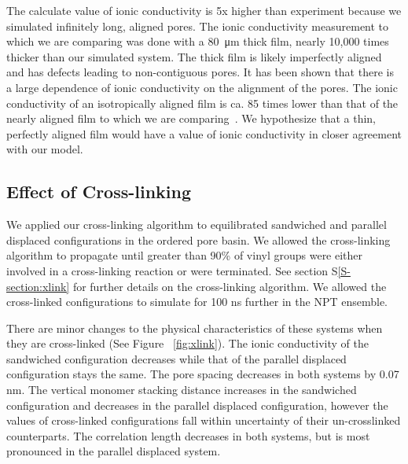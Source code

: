 \documentclass[journal=jpcbfk,manuscript=article]{achemso}
\begin{document}
  The calculate value of ionic conductivity is 5x higher than experiment because 
  we simulated infinitely long, aligned pores. The ionic conductivity measurement 
  to which we are comparing was done with a \SI{80}{\micro\metre} thick film, 
  nearly 10,000 times thicker than our simulated
  system. The thick film is likely imperfectly aligned and has defects leading to
  non-contiguous pores. It has been shown that there is a large dependence of 
  ionic conductivity on the alignment of the pores. The ionic conductivity of an
  isotropically aligned film is ca. 85 times lower than that of the nearly aligned
  film to which we are comparing~\cite{feng_scalable_2014}. We hypothesize that a 
  thin, perfectly aligned film would have a value of ionic conductivity in closer
  agreement with our model.

  \subsection{Effect of Cross-linking}\label{section:xlink}

  We applied our cross-linking algorithm to equilibrated sandwiched and parallel
  displaced configurations in the ordered pore basin. We allowed the cross-linking
  algorithm to propagate until greater than 90\% of vinyl groups were either involved
  in a cross-linking reaction or were terminated. See section S\ref{S-section:xlink}
  for further details on the cross-linking algorithm. We allowed the cross-linked
  configurations to simulate for 100 ns further in the NPT ensemble. 

  There are minor changes to the physical characteristics of these systems when 
  they are cross-linked (See Figure ~\ref{fig:xlink}). The ionic conductivity of 
  the sandwiched configuration decreases while that of the parallel displaced 
  configuration stays the same. The pore spacing decreases in both systems by
  0.07 nm. The vertical monomer stacking distance increases in the sandwiched
  configuration and decreases in the parallel displaced configuration, however the 
  values of cross-linked configurations fall within uncertainty of their un-crosslinked
  counterparts. The correlation length decreases in both systems, 
but is most pronounced in the parallel displaced system.  
  
\end{document}

